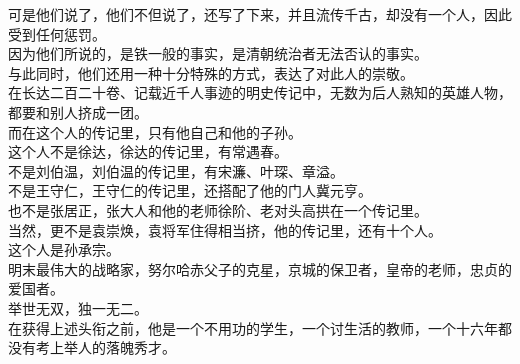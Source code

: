 \begin{multicols}{\theparacolNo}
可是他们说了，他们不但说了，还写了下来，并且流传千古，却没有一个人，因此受到任何惩罚。\\

因为他们所说的，是铁一般的事实，是清朝统治者无法否认的事实。\\

与此同时，他们还用一种十分特殊的方式，表达了对此人的崇敬。\\

在长达二百二十卷、记载近千人事迹的明史传记中，无数为后人熟知的英雄人物，都要和别人挤成一团。\\

而在这个人的传记里，只有他自己和他的子孙。\\

这个人不是徐达，徐达的传记里，有常遇春。\\

不是刘伯温，刘伯温的传记里，有宋濂、叶琛、章溢。\\

不是王守仁，王守仁的传记里，还搭配了他的门人冀元亨。\\

也不是张居正，张大人和他的老师徐阶、老对头高拱在一个传记里。\\

当然，更不是袁崇焕，袁将军住得相当挤，他的传记里，还有十个人。\\

这个人是孙承宗。\\

明末最伟大的战略家，努尔哈赤父子的克星，京城的保卫者，皇帝的老师，忠贞的爱国者。\\

举世无双，独一无二。\\

在获得上述头衔之前，他是一个不用功的学生，一个讨生活的教师，一个十六年都没有考上举人的落魄秀才。\\

\ifnum{}
	\end{multicols}
\fi
\newpage
